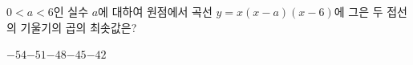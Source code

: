 $0<a<6$인 실수 $a$에 대하여 원점에서 곡선 $y=x(x-a)(x-6)$에 그은 두 접선의 기울기의 곱의 최솟값은?
\begin{choices32}{$-54$}{$-51$}{$-48$}{$-45$}{$-42$}\end{choices32}
